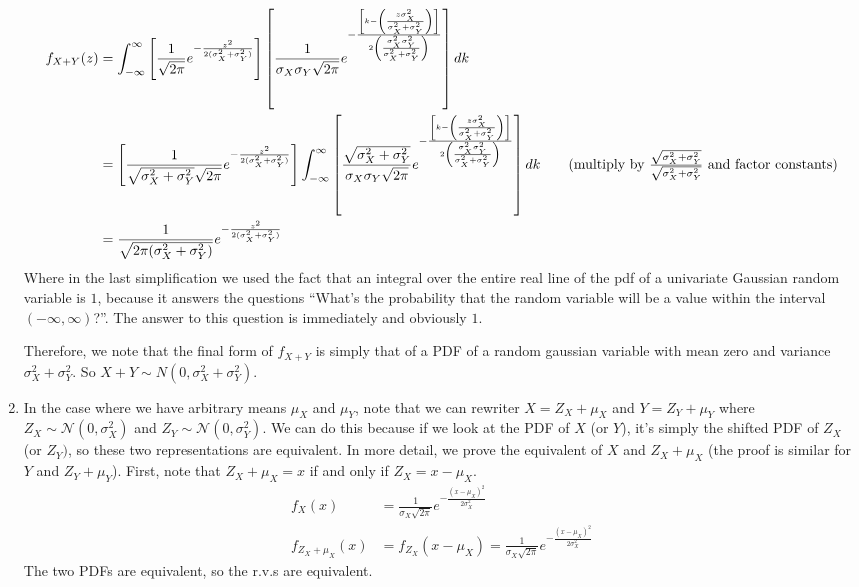 \documentclass[submit]{harvardml}
\theoremstyle{plain}
\begin{document}
\begin{enumerate}[label=(\alph*)]
\begin{align*}
f_{X+Y}(z) &= \int_{-\infty}^{\infty} \left[\frac{1}{\sqrt{2\pi}}e^{-\frac{z^2}{2(\sigma_X^2 + \sigma_Y^2)}}\right]\left[\frac{1}{\sigma_X\sigma_Y\sqrt{2\pi}}e^{-\frac{\left[k - \left(\frac{z\sigma_X^2}{\sigma_X^2 + \sigma_Y^2} \right) \right]}{2\left(\frac{\sigma_X^2\sigma_Y^2}{\sigma_X^2 + \sigma_Y^2} \right)}} \right] dk \\
&= \left[\frac{1}{\sqrt{\sigma_X^2 + \sigma_Y^2}\sqrt{2\pi}}e^{-\frac{z^2}{2(\sigma_X^2 + \sigma_Y^2)}}\right] \int_{-\infty}^{\infty} \left[\frac{\sqrt{\sigma_X^2 + \sigma_Y^2}}{\sigma_X\sigma_Y\sqrt{2\pi}}e^{-\frac{\left[k - \left(\frac{z\sigma_X^2}{\sigma_X^2 + \sigma_Y^2} \right) \right]}{2\left(\frac{\sigma_X^2\sigma_Y^2}{\sigma_X^2 + \sigma_Y^2} \right)}} \right] dk \tag{multiply by $\frac{\sqrt{\sigma_X^2 + \sigma_Y^2}}{\sqrt{\sigma_X^2 + \sigma_Y^2}}$ and factor constants} \\
&= \frac{1}{\sqrt{2\pi(\sigma_X^2 + \sigma_Y^2)}}e^{-\frac{z^2}{2(\sigma_X^2 + \sigma_Y^2)}}
\end{align*}
Where in the last simplification we used the fact that an integral over the entire real line of the pdf of a univariate Gaussian random variable is $1$, because it answers the questions ``What's the probability that the random variable will be a value within the interval $(-\infty, \infty)$?''. The answer to this question is immediately and obviously $1$.

Therefore, we note that the final form of $f_{X+Y}$ is simply that of a PDF of a random gaussian variable with mean zero and variance $\sigma_X^2 + \sigma_Y^2$. So $X + Y \sim N(0,\sigma_X^2 + \sigma_Y^2)$.
\item In the case where we have arbitrary means $\mu_X$ and $\mu_Y$, note that we can rewriter $X = Z_X + \mu_X$ and $Y = Z_Y + \mu_Y$ where $Z_X \sim \mathcal{N}(0,\sigma_X^2)$ and $Z_Y \sim \mathcal{N}(0,\sigma_Y^2)$. We can do this because if we look at the PDF of $X$ (or $Y$), it's simply the shifted PDF of $Z_X$ (or $Z_Y)$, so these two representations are equivalent. In more detail, we prove the equivalent of $X$ and $Z_X + \mu_X$ (the proof is similar for $Y$ and $Z_Y + \mu_Y$). First, note that $Z_X + \mu_X = x$ if and only if $Z_X = x - \mu_X$.
\begin{align*}
f_X(x) &= \frac{1}{\sigma_X\sqrt{2\pi}}e^{-\frac{(x-\mu_X)^2}{2\sigma_X^2}} \tag{by definition of univariate Gaussian pdf} \\
f_{Z_X + \mu_X}(x) &= f_{Z_X}(x - \mu_X) = \frac{1}{\sigma_X\sqrt{2\pi}}e^{-\frac{(x-\mu_X)^2}{2\sigma_X^2}}
\end{align*}
The two PDFs are equivalent, so the r.v.s are equivalent.


\end{enumerate}
\end{document}
